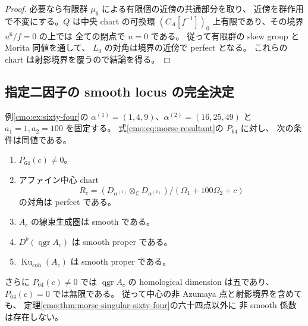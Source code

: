 \begin{proof}
必要なら有限群 $\mu_6$ による有限個の近傍の共通部分を取り、
近傍を群作用で不変にする。$Q$ は中央 chart の可換環
$(C_A[f^{-1}])_0$ 上有限であり、その境界 $u^6/f=0$ の上では
全ての閉点で $u=0$ である。
従って有限群の skew group と Morita 同値を通して、
$L_0$ の対角は境界の近傍で perfect となる。
これらの chart は射影境界を覆うので結論を得る。
\end{proof}

\subsection{指定二因子の smooth locus の完全決定}

\begin{theorem}
\label{cmo:thm:exact-sixty-four}
例\ref{cmo:ex:sixty-four}の
$\alpha^{(1)}=(1,4,9)$、$\alpha^{(2)}=(16,25,49)$ と
$a_1=1,a_2=100$ を固定する。
式\eqref{cmo:eq:morse-resultant}の $P_{64}$ に対し、
次の条件は同値である。
\begin{enumerate}
 \item $P_{64}(c)\ne0$。
 \item アファイン中心 chart
 \[
  R_c=(D_{\alpha^{(1)}}\otimes_{\mathbb C}D_{\alpha^{(2)}})
           /(\Omega_1+100\Omega_2+c)
 \]
 の対角は perfect である。
 \item $A_c$ の線束生成圏は smooth である。
 \item $D^b(\operatorname{qgr}A_c)$ は smooth proper である。
 \item $\operatorname{Ku}_{\mathrm{coh}}(A_c)$ は smooth proper である。
\end{enumerate}
さらに $P_{64}(c)\ne0$ では $\operatorname{qgr}A_c$ の
homological dimension は五であり、$P_{64}(c)=0$ では無限である。
従って中心の非 Azumaya 点と射影境界を含めても、
定理\ref{cmo:thm:morse-singular-sixty-four}の六十四点以外に
非 smooth 係数は存在しない。
\end{theorem}
